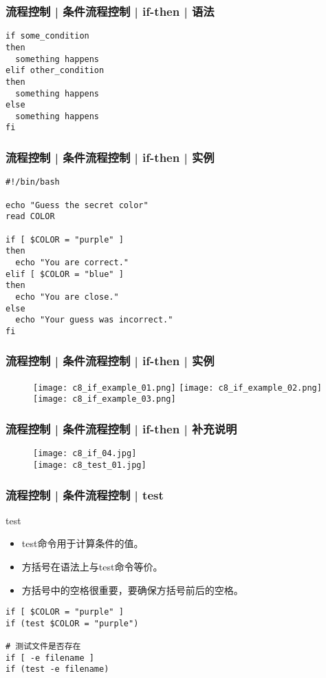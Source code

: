 \begin{frame}[fragile]
  \frametitle{流程控制 | 条件流程控制 | if-then | \alert{语法}}
\begin{lstlisting}
if some_condition
then
  something happens
elif other_condition
then
  something happens
else
  something happens
fi
\end{lstlisting}
\end{frame}

\begin{frame}[fragile]
  \frametitle{流程控制 | 条件流程控制 | if-then | 实例}
\begin{lstlisting}
#!/bin/bash

echo "Guess the secret color"
read COLOR

if [ $COLOR = "purple" ]
then
  echo "You are correct."
elif [ $COLOR = "blue" ]
then
  echo "You are close."
else
  echo "Your guess was incorrect."
fi
\end{lstlisting}
\end{frame}

\begin{frame}
  \frametitle{流程控制 | 条件流程控制 | if-then | \alert{实例}}
  \begin{figure}
    \texttt{[image: c8\_if\_example\_01.png]}\quad
    \texttt{[image: c8\_if\_example\_02.png]}\\
    \texttt{[image: c8\_if\_example\_03.png]}
  \end{figure}
\end{frame}

\begin{frame}
  \frametitle{流程控制 | 条件流程控制 | if-then | 补充说明}
  \begin{figure}
    \centering
    \texttt{[image: c8\_if\_04.jpg]}\\
    \texttt{[image: c8\_test\_01.jpg]}
  \end{figure}
\end{frame}

\begin{frame}[fragile]
  \frametitle{流程控制 | 条件流程控制 | \alert{test}}
  \begin{block}{test}
    \begin{itemize}
      \item test命令用于计算条件的值。
      \item 方括号在语法上与test命令等价。
      \item 方括号中的空格很重要，要确保方括号前后的空格。
    \end{itemize}
  \end{block}
  \pause
\begin{lstlisting}
if [ $COLOR = "purple" ]
if (test $COLOR = "purple")

# 测试文件是否存在
if [ -e filename ]
if (test -e filename)
\end{lstlisting}
\end{frame}

